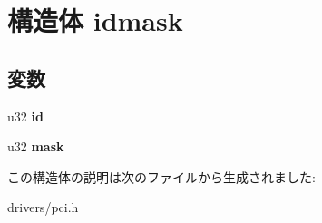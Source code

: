 \section{構造体 idmask}
\label{structidmask}
\subsection*{変数}
\begin{DoxyCompactItemize}
\item 
u32 {\bfseries id}\label{structidmask_a3501aa101a72a5acae8fc081f8f3f412}

\item 
u32 {\bfseries mask}\label{structidmask_af8208b4c461c5a03ac81aecfbf557fc1}

\end{DoxyCompactItemize}


この構造体の説明は次のファイルから生成されました\-:\begin{DoxyCompactItemize}
\item 
drivers/pci.\-h\end{DoxyCompactItemize}
